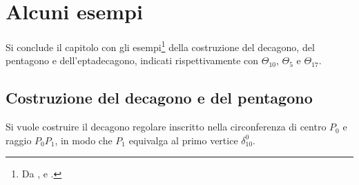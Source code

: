 \section{Alcuni esempi}

Si conclude il capitolo con gli esempi\footnote{Da \cite{sitowolfram}, \cite{sitoroi} e \cite{sito4}.  } della costruzione del decagono, del pentagono e dell'eptadecagono, indicati rispettivamente con $\Theta_{10}$, $\Theta_{5}$ e $\Theta_{17}$.

\subsection{Costruzione del decagono e del pentagono}  \label{decagono}

Si vuole costruire il decagono regolare inscritto nella circonferenza di centro $P_{0}$ e raggio $P_{0} P_{1}$, in modo che $P_{1}$ equivalga al primo vertice $\delta_{10}^{0}$. 

